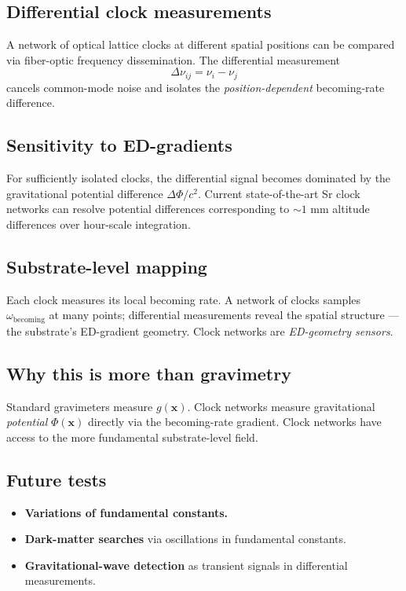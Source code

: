 \documentclass[11pt,a4paper]{article}
\begin{document}
\subsection{Differential clock measurements}

A network of optical lattice clocks at different spatial positions can be compared via fiber-optic frequency dissemination. The differential measurement
\[
\Delta\nu_{ij} = \nu_i - \nu_j
\]
cancels common-mode noise and isolates the \emph{position-dependent} becoming-rate difference.

\subsection{Sensitivity to ED-gradients}

For sufficiently isolated clocks, the differential signal becomes dominated by the gravitational potential difference $\Delta\Phi/c^2$. Current state-of-the-art Sr clock networks can resolve potential differences corresponding to $\sim 1$ mm altitude differences over hour-scale integration.

\subsection{Substrate-level mapping}

Each clock measures its local becoming rate. A network of clocks samples $\omega_{\mathrm{becoming}}$ at many points; differential measurements reveal the spatial structure --- the substrate's ED-gradient geometry. Clock networks are \emph{ED-geometry sensors}.

\subsection{Why this is more than gravimetry}

Standard gravimeters measure $g(\mathbf{x})$. Clock networks measure gravitational \emph{potential} $\Phi(\mathbf{x})$ directly via the becoming-rate gradient. Clock networks have access to the more fundamental substrate-level field.

\subsection{Future tests}

\begin{itemize}[noitemsep]
  \item \textbf{Variations of fundamental constants.}
  \item \textbf{Dark-matter searches} via oscillations in fundamental constants.
  \item \textbf{Gravitational-wave detection} as transient signals in differential measurements.
\end{itemize}
\end{document}
